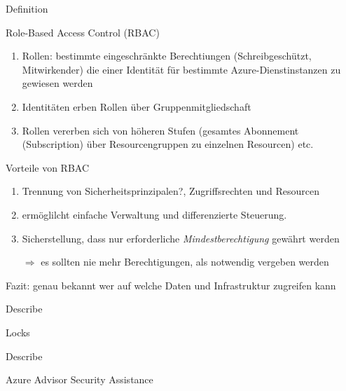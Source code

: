 \documentclass{scrartcl}
\newenvironment{flashcard}[2][]{%
    #1
    \vfill
    \centerline{\Large{#2}}
    \vfill
    \newpage
}
{\newpage}
\begin{document}
    \begin{flashcard}[Definition]{Role-Based Access Control (RBAC)}
        \begin{enumerate}
            \item Rollen: bestimmte eingeschränkte Berechtiungen (Schreibgeschützt, Mitwirkender) die einer Identität für bestimmte Azure-Dienstinstanzen zu gewiesen werden
            \item Identitäten erben Rollen über Gruppenmitgliedschaft
            \item Rollen vererben sich von höheren Stufen (gesamtes Abonnement (Subscription) über Resourcengruppen zu einzelnen Resourcen) etc.
        \end{enumerate}
    \end{flashcard}

    \begin{flashcard}[]{Vorteile von RBAC}
        \begin{enumerate}
            \item Trennung von Sicherheitsprinzipalen?, Zugriffsrechten und Resourcen
            \item ermöglilcht einfache Verwaltung und differenzierte Steuerung.
            \item Sicherstellung, dass nur erforderliche \emph{Mindestberechtigung} gewährt werden
            \item[$\Rightarrow$] es sollten nie mehr Berechtigungen, als notwendig vergeben werden
        \end{enumerate}
        Fazit: genau bekannt wer auf welche Daten und Infrastruktur zugreifen kann
    \end{flashcard}

    \begin{flashcard}[Describe]{Locks}

    \end{flashcard}

    \begin{flashcard}[Describe]{Azure Advisor Security Assistance}

    \end{flashcard}
\end{document}
